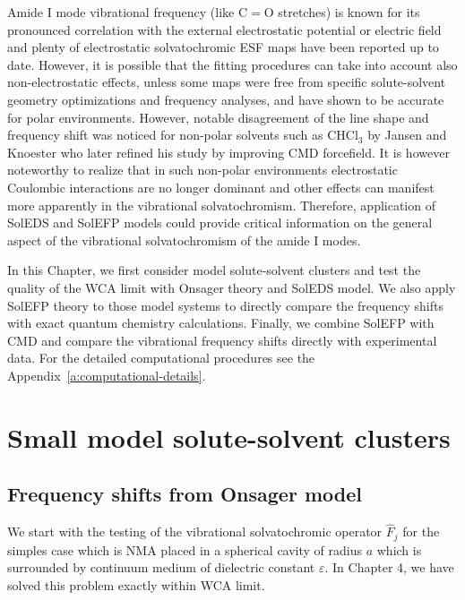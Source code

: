\documentclass[a4paper,titlepage,twoside,fleqn,12pt]{book}
\begin{document}
\begin{refsection}
Amide I mode vibrational frequency (like C$=$O stretches) 
is known for its pronounced
correlation with the external electrostatic potential or
electric field and plenty of electrostatic solvatochromic
ESF maps have been reported up to date.\citep{Hayashi.Zhuang.Mukamel.JPCA.2005,Jansen.Knoester.JCP.2006,
Lee.Choi.Cho.JCP.2012,Torii.JPCL.2015}
However, it is possible that the fitting procedures
can take into account also non\hyp{}electrostatic effects,
unless some maps were free from specific solute\hyp{}solvent
geometry optimizations and frequency analyses,
and have shown to be accurate for polar environments.\citep{Hayashi.Zhuang.Mukamel.JPCA.2005,Jansen.Knoester.JCP.2006}
However, notable disagreement of the line shape and frequency shift was noticed for
non\hyp{}polar solvents such as CHCl$_3$ by Jansen and Knoester \citep{Jansen.Knoester.JCP.2006}
who later refined his study by improving CMD forcefield.\citep{Jansen.JPCB.2014}
It is however noteworthy to realize that in such non\hyp{}polar
environments electrostatic Coulombic interactions are no longer
dominant and other effects can manifest more apparently
in the vibrational solvatochromism. Therefore, application of
SolEDS and SolEFP models could provide critical information
on the general aspect of the vibrational solvatochromism of the amide I modes.

In this Chapter, we first consider model solute\hyp{}solvent
clusters and test the quality of the WCA limit with Onsager theory
and SolEDS model.
We also apply SolEFP theory to those model systems
to directly compare the frequency shifts with exact quantum chemistry
calculations.\citep{Blasiak.Lee.Cho.JCP.2013,Blasiak.Cho.JCP.2014,Blasiak.Cho.JCP.2015} 
Finally, we combine SolEFP with CMD and compare the vibrational
frequency shifts directly with experimental data.\citep{Blasiak.Cho.JCP.2015}
For the detailed computational procedures see the Appendix~\ref{a:computational-details}.



\section{Small model solute\hyp{}solvent clusters}

\subsection{Frequency shifts from Onsager model}

We start with the testing of the vibrational solvatochromic 
operator $\hat{F}_j$ for the simples case which is NMA
placed in a spherical cavity of radius $a$ which is surrounded
by continuum medium of dielectric constant $\varepsilon$.
In Chapter 4, we have solved this problem exactly within
WCA limit. 


\end{refsection}
\end{document}
